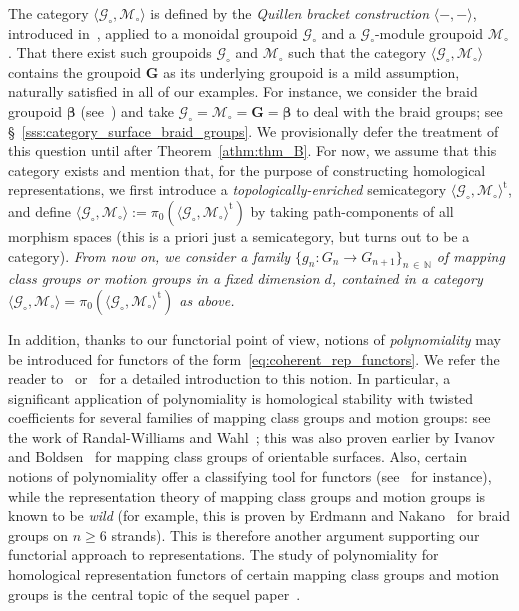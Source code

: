 \documentclass[AHL,Unicode,published]{cedram}
\newcommand{\mt}{\mathrm{t}}
\newcommand{\fG}{\mathbf{G}}
\newcommand{\cG}{\mathcal{G}}
\newcommand{\cM}{\mathcal{M}}
\newcommand{\bN}{\mathbb{N}}
\newcommand{\Beta}{\boldsymbol{\beta}}
\renewcommand{\geq}{\geqslant}
\begin{document}
The category $\langle \cG_{\circ}, \cM_{\circ} \rangle$ is defined by the \emph{Quillen bracket construction} $\langle -,- \rangle$, introduced in~\cite[p.~219]{graysonQuillen}, applied to a monoidal groupoid $\cG_{\circ}$ and a $\cG_{\circ}$-module groupoid $\cM_{\circ}$. That there exist such groupoids $\cG_{\circ}$ and $\cM_{\circ}$ such that the category $\langle \cG_{\circ}, \cM_{\circ} \rangle$ contains the groupoid $\fG$ as its underlying groupoid is a mild assumption, naturally satisfied in all of our examples. For instance, we consider the braid groupoid $\Beta$ (see~\cite[Chap.~XI, \S~4]{MacLane1}) and take $\cG_{\circ} = \cM_{\circ} = \fG = \Beta$ to deal with the braid groups; see \S~\ref{sss:category_surface_braid_groups}. We provisionally defer the treatment of this question until after Theorem~\ref{athm:thm_B}. For now, we assume that this category exists and mention that, for the purpose of constructing homological representations, we first introduce a \emph{topologically-enriched} semicategory $\langle \cG_{\circ}, \cM_{\circ} \rangle^{\mt}$, and define $\langle \cG_{\circ}, \cM_{\circ} \rangle := \pi_{0}(\langle \cG_{\circ}, \cM_{\circ} \rangle^{\mt})$ by taking path-components of all morphism spaces (this is a priori just a semicategory, but turns out to be a category). \emph{From now on, we consider a family $\{g_{n} \colon G_{n} \to G_{n+1}\}_{n\,\in\,\bN}$ of mapping class groups or motion groups in a fixed dimension $d$, contained in a category $\langle \cG_{\circ}, \cM_{\circ} \rangle=\pi_{0}(\langle \cG_{\circ}, \cM_{\circ} \rangle^{\mt})$ as above.}

In addition, thanks to our functorial point of view, notions of \emph{polynomiality} may be introduced for functors of the form~\eqref{eq:coherent_rep_functors}. We refer the reader to~\cite[\S~4.1]{RWW} or~\cite[\S~4.1]{PSIIp} for a detailed introduction to this notion. In particular, a significant application of polynomiality is homological stability with twisted coefficients for several families of mapping class groups and motion groups: see the work of Randal-Williams and Wahl~\cite[Theorems~D, 5.26 and I]{RWW}; this was also proven earlier by Ivanov~\cite{Ivanov} and Boldsen~\cite{Boldsen} for mapping class groups of orientable surfaces. Also, certain notions of polynomiality offer a classifying tool for functors (see~\cite[\S~1.3]{DV3} for instance), while the representation theory of mapping class groups and motion groups is known to be \emph{wild} (for example, this is proven by Erdmann and Nakano~\cite{ErdmannNakano} for braid groups on $n\geq 6$ strands). This is therefore another argument supporting our functorial approach to representations. The study of polynomiality for homological representation functors of certain mapping class groups and motion groups is the central topic of the sequel paper~\cite{PSIIp}.
\end{document}
